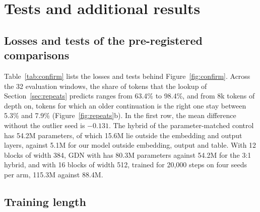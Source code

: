 \section{Tests and additional results}
\label{app:extra}

\subsection{Losses and tests of the pre-registered comparisons}
\label{app:tests}

\begin{table}[!htb]
\centering
\footnotesize
\setlength{\tabcolsep}{2.0pt}

\caption{Losses and tests for the comparisons of Figure~\ref{fig:confirm}, in the same order, at
16k context on seeds 20--27 ($n = 8$, paired; $n = 4$ at $16\times512$). Models are given as
blocks $\times$ width with their parameter count; in the first group every reference is a 3:1
hybrid, and ``+ table'' marks the one with a static $N$-gram table. Loss is the mean over seeds; $\Delta$ is ours
minus reference, with its 95\% bootstrap interval over seeds below it. $p_{\mathrm{Holm}}$ is the
one-sided Wilcoxon $p$ after Holm correction within the pre-registered family. In the row marked
164M/328M our model trains for 164M tokens and the reference for 328M
(Section~\ref{sec:length}). The with-cache difference was tested in the first two rows (same
adjusted $p$) and is reported without a test in the others. Per-seed losses are in
Tables~\ref{tab:seeds164} and~\ref{tab:seedslong}.}
\label{tab:confirm}
\end{table}

Table~\ref{tab:confirm} lists the losses and tests behind Figure~\ref{fig:confirm}. Across the 32
evaluation windows, the share of tokens that the lookup of Section~\ref{sec:repeats} predicts
ranges from 63.4\% to 98.4\%, and from 8k tokens of depth on, tokens for which an older
continuation is the right one stay between 5.3\% and 7.9\% (Figure~\ref{fig:repeats}b). In the
first row, the mean difference without the outlier seed is $-0.131$. The hybrid of the
parameter-matched control has 54.2M parameters, of which 15.6M lie outside the embedding and
output layers,
against 5.1M for our model outside embedding, output and table. With 12 blocks of width 384, GDN
with \ingram{} has 80.3M parameters against 54.2M for the 3:1 hybrid, and with 16 blocks of width
512, trained for 20,000 steps on four seeds per arm, 115.3M against 88.4M.

\subsection{Training length}
\label{app:length}

